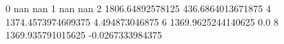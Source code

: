 0 nan nan
1 nan nan
2 1806.64892578125 436.6864013671875
4 1374.4573974609375 4.494873046875
6 1369.9625244140625 0.0
8 1369.935791015625 -0.0267333984375
